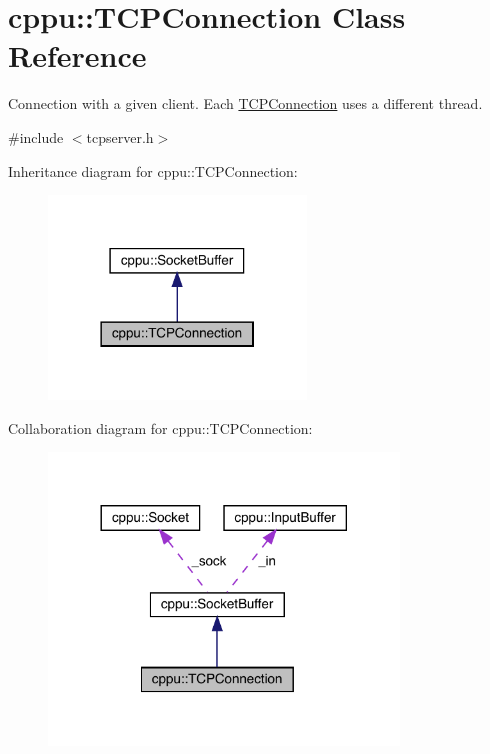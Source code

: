 \hypertarget{classcppu_1_1_t_c_p_connection}{}\section{cppu\+::T\+C\+P\+Connection Class Reference}
\label{classcppu_1_1_t_c_p_connection}


Connection with a given client. Each \mbox{\hyperlink{classcppu_1_1_t_c_p_connection}{T\+C\+P\+Connection}} uses a different thread.  




{\ttfamily \#include $<$tcpserver.\+h$>$}



Inheritance diagram for cppu\+::T\+C\+P\+Connection\+:
\nopagebreak
\begin{figure}[H]
\begin{center}
\leavevmode
\includegraphics[width=194pt]{classcppu_1_1_t_c_p_connection__inherit__graph}
\end{center}
\end{figure}


Collaboration diagram for cppu\+::T\+C\+P\+Connection\+:
\nopagebreak
\begin{figure}[H]
\begin{center}
\leavevmode
\includegraphics[width=264pt]{classcppu_1_1_t_c_p_connection__coll__graph}
\end{center}
\end{figure}
